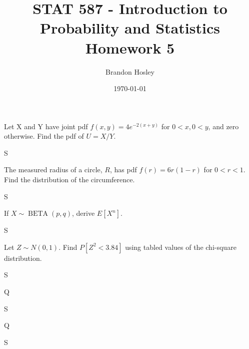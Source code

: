 \documentclass[answers]{exam}
\title{STAT 587 - Introduction to Probability and Statistics%
	\\ Homework 5}
\author{Brandon Hosley}
\date{\today}
\begin{document}
\maketitle
\begin{questions}

\question 
Let X and Y have joint pdf \(f(x,y)=4e^{-2(x+y)}\) for \(0<x,0<y\), and zero otherwise. 
Find the pdf of \(U=X/Y\).
\begin{solution}
	S
\end{solution}

\question 
The measured radius of a circle, \(R\), has pdf \(f(r)=6r(1-r)\) for \(0<r<1\). 
Find the distribution of the circumference.
\begin{solution}
	S
\end{solution}

\question 
If \(X \sim \operatorname{BETA}(p,q)\), derive \(E[X^n]\).
\begin{solution}
	S
\end{solution}

\question 
Let \(Z \sim N(0,1)\). Find \(P[Z^2<3.84]\) using tabled values of the chi-square distribution.
\begin{solution}
	S
\end{solution}

\question 
Q
\begin{solution}
	S
\end{solution}

\question 
Q
\begin{solution}
	S
\end{solution}


\end{questions}
\end{document}
